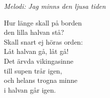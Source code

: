 {\footnotesize\textit{Melodi: Jag minns den ljusa tiden}}\par
\vspace{10pt}
Hur länge skall på borden\\
den lilla halvan stå?\\
Skall snart ej höras orden:\\
Låt halvan gå, låt gå!\\
Det ärvda vikingasinne\\
till supen trår igen,\\
och helans trogna minne\\
i halvan går igen.
